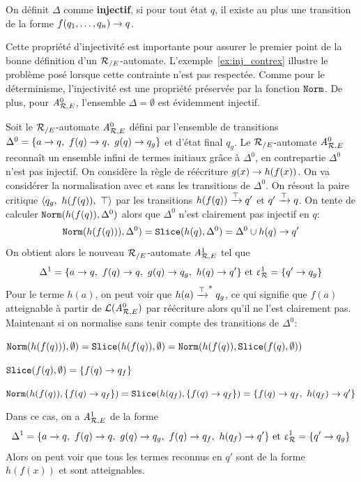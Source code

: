 \begin{definition}
  On définit $\Delta$ comme \textbf{injectif}, si pour tout état $q$,
  il existe au plus une transition de la forme $f(q_1, \dots, q_n) \rightarrow q$.
\end{definition}
Cette propriété d'injectivité est importante pour assurer le premier point de la bonne définition
d'un ${\mathcal R_{/E}}$-automate. L'exemple~\ref{ex:inj_contrex} illustre le problème posé
lorsque cette contrainte n'est pas respectée. Comme pour le déterminisme, l'injectivité
est une propriété préservée par la fonction $\mathtt{Norm}$. De plus, pour ${\mathit A}_{\mathcal R,E}^0$, l'ensemble $\Delta = \emptyset$
est évidemment injectif.

\begin{example}
  \label{ex:inj_contrex}
  Soit le ${\mathcal R_{/E}}$-automate ${\mathit A}_{\mathcal R,E}^0$ défini par l'ensemble de transitions
  $\Delta^0 = \{ a \rightarrow q,\ f(q)\rightarrow q,\ g(q) \rightarrow q_g\}$ et d'état final $q_g$.
  Le ${\mathcal R_{/E}}$-automate ${\mathit A}_{\mathcal R,E}^0$ reconnaît un ensemble infini de termes initiaux grâce à $\Delta^0$,
  en contrepartie $\Delta^0$ n'est pas injectif.
  On considère la règle de réécriture $g(x) \rightarrow h(f(x))$. On va considérer la normalisation 
  avec et sans les transitions de $\Delta^0$. On résout la paire critique $\la q_g,\ h(f(q)),\ \top\ra$ 
  par les transitions $h(f(q)) \xrightarrow{\top} q'$ et $q'\xrightarrow{\top} q$. On tente de calculer $\mathtt{Norm}(h(f(q)),\Delta^0)$ 
  alors que $\Delta^0$ n'est clairement pas injectif en $q$:
  \[\mathtt{Norm}(h(f(q))),\Delta^0) = \mathtt{Slice}(h(q),\Delta^0) = \Delta^0 \cup h(q) \rightarrow q'\]
  On obtient alors le nouveau ${\mathcal R_{/E}}$-automate ${\mathit A}_{\mathcal R,E}^1$ tel que 
  \[\Delta^1 = \{a \rw q,\ f(q)\rw q,\ g(q) \rw q_g,\ h(q) \rw q'\}\textrm{ et } \Drw^1= \{ q' \rw q_g\}\]
  Pour le terme $h(a)$, on peut voir que $h(a) \xrightarrow{\top}^* q_g$, ce qui signifie que $f(a)$ atteignable à partir de
  $\mathcal{L}({\mathit A}_{\mathcal R,E}^0)$ par réécriture alors qu'il ne l'est clairement pas. Maintenant si on normalise sans tenir
  compte des transitions de $\Delta^0$:
  \begin{description}
  \item $\mathtt{Norm}(h(f(q))),\emptyset) = \mathtt{Slice}(h(f(q)),\emptyset) = \mathtt{Norm}(h(f(q)), \mathtt{Slice}(f(q),\emptyset))$
  \item $\mathtt{Slice}(f(q),\emptyset) = \{f(q) \rightarrow q_f\}$
  \item $\mathtt{Norm}(h(f(q)), \{f(q) \rightarrow q_f\}) = \mathtt{Slice}(h(q_f), \{f(q) \rightarrow q_f\}) = \{f(q) \rightarrow q_f,\ h(q_f) \rightarrow q'\}$
  \end{description}
  Dans ce cas, on a ${\mathit A}_{\mathcal R,E}^1$ de la forme 
  \[\Delta^1 = \{a \rw q,\ f(q)\rw q,\ g(q) \rw q_g,\ f(q) \rw q_f,\ h(q_f) \rw q'\}
  \textrm{ et } \Drw^1= \{ q' \rw q_g\}\]
  Alors on peut voir que tous les termes reconnus en $q'$ sont de la forme $h(f(x))$ et sont atteignables.
\end{example}

